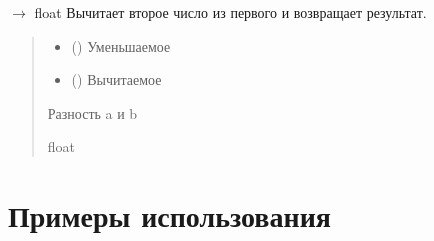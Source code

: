 \documentclass[letterpaper,10pt,russian]{sphinxmanual}
\begin{document}
\begin{fulllineitems}
\label{\detokenize{Calculator:Calculator.subtract}}
\pysigstartsignatures
\pysiglinewithargsret
{}
{\sphinxparamcomma {}}
{{ $\rightarrow$ float}}
\pysigstopsignatures
\sphinxAtStartPar
Вычитает второе число из первого и возвращает результат.
\begin{quote}\begin{description}
\begin{itemize}
\item {} 
\sphinxAtStartPar
{} () \textendash{} Уменьшаемое

\item {} 
\sphinxAtStartPar
{} () \textendash{} Вычитаемое

\end{itemize}

\sphinxAtStartPar
Разность a и b

\sphinxAtStartPar
float

\end{description}\end{quote}
\begin{description}
\begin{sphinxVerbatim}[commandchars=\\\{\}]
 
\end{sphinxVerbatim}

\end{description}

\end{fulllineitems}


\sphinxstepscope


\chapter{Примеры использования}
\label{\detokenize{usage:id1}}\label{\detokenize{usage::doc}}
\begin{sphinxVerbatim}[commandchars=\\\{\}]
  
   
   
\end{sphinxVerbatim}
\end{document}
